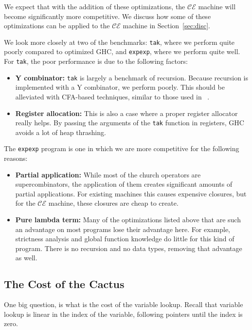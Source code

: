 We expect that with the addition of these optimizations, the $\mathcal{CE}$
machine will become significantly more competitive. We discuss how some of these
optimizations can be applied to the $\mathcal{CE}$ machine in
Section~\ref{sec:disc}.

We look more closely at two of the benchmarks: \texttt{tak}, where we perform
quite poorly compared to optimized GHC, and \texttt{expexp}, where we perform
quite well. For \texttt{tak}, the poor performance is due to the
following factors: 

\begin{itemize}
\item \textbf{Y combinator:} \texttt{tak} is largely a benchmark of recursion.
Because recursion is implemented with a Y combinator, we perform poorly. This
should be alleviated with CFA-based techniques, similar to those used in ~\cite{rozas1992taming}. 
\item \textbf{Register allocation:} This is also a case where a proper register
allocator really helps. By passing the arguments of the \texttt{tak} function in
registers, GHC avoids a lot of heap thrashing.
\end{itemize}

The \texttt{expexp} program is one in which we are more competitive for the following reasons:
\begin{itemize}
\item \textbf{Partial application:} While most of the church operators are
supercombinators, the application of them creates significant amounts of partial
applications. For existing machines this causes expensive closures, but for the
$\mathcal{CE}$ machine, these closures are cheap to create.  
\item \textbf{Pure lambda term:} Many of the optimizations listed above that
are such an advantage on most programs lose their advantage here. For example,
strictness analysis and global function knowledge do little for this kind of
program. There is no recursion and no data types, removing that advantage as
well. 

\end{itemize}

\subsection{The Cost of the Cactus}

One big question, is what is the cost of the variable lookup. Recall that
variable lookup is linear in the index of the variable, following pointers until
the index is zero.

